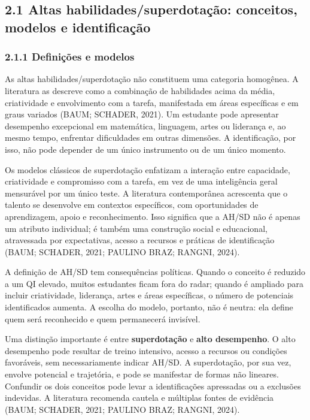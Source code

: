 \subsection{2.1 Altas habilidades/superdotação: conceitos, modelos e
identificação}\label{altas-habilidadessuperdotauxe7uxe3o-conceitos-modelos-e-identificauxe7uxe3o}

\subsubsection{2.1.1 Definições e
modelos}\label{definiuxe7uxf5es-e-modelos}

As altas habilidades/superdotação não constituem uma categoria
homogênea. A literatura as descreve como a combinação de habilidades
acima da média, criatividade e envolvimento com a tarefa, manifestada em
áreas específicas e em graus variados (BAUM; SCHADER, 2021). Um
estudante pode apresentar desempenho excepcional em matemática,
linguagem, artes ou liderança e, ao mesmo tempo, enfrentar dificuldades
em outras dimensões. A identificação, por isso, não pode depender de um
único instrumento ou de um único momento.

Os modelos clássicos de superdotação enfatizam a interação entre
capacidade, criatividade e compromisso com a tarefa, em vez de uma
inteligência geral mensurável por um único teste. A literatura
contemporânea acrescenta que o talento se desenvolve em contextos
específicos, com oportunidades de aprendizagem, apoio e reconhecimento.
Isso significa que a AH/SD não é apenas um atributo individual; é também
uma construção social e educacional, atravessada por expectativas,
acesso a recursos e práticas de identificação (BAUM; SCHADER, 2021;
PAULINO BRAZ; RANGNI, 2024).

A definição de AH/SD tem consequências políticas. Quando o conceito é
reduzido a um QI elevado, muitos estudantes ficam fora do radar; quando
é ampliado para incluir criatividade, liderança, artes e áreas
específicas, o número de potenciais identificados aumenta. A escolha do
modelo, portanto, não é neutra: ela define quem será reconhecido e quem
permanecerá invisível.

Uma distinção importante é entre \textbf{superdotação} e \textbf{alto
desempenho}. O alto desempenho pode resultar de treino intensivo, acesso
a recursos ou condições favoráveis, sem necessariamente indicar AH/SD. A
superdotação, por sua vez, envolve potencial e trajetória, e pode se
manifestar de formas não lineares. Confundir os dois conceitos pode
levar a identificações apressadas ou a exclusões indevidas. A literatura
recomenda cautela e múltiplas fontes de evidência (BAUM; SCHADER, 2021;
PAULINO BRAZ; RANGNI, 2024).

